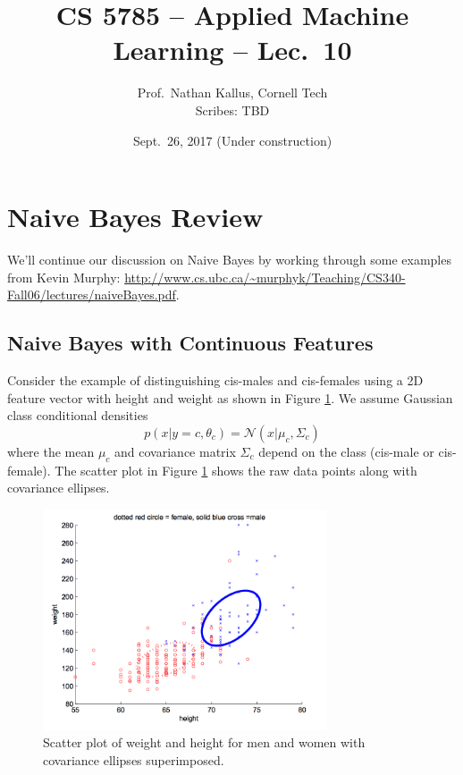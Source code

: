 \documentclass[a4paper]{article}
\title{CS 5785 -- Applied Machine Learning -- Lec.\ 10}
\author{Prof.\ Nathan Kallus, Cornell Tech\\Scribes: TBD}
\date{Sept.\ 26, 2017 (Under construction)}
\begin{document}
\maketitle
 
\section{Naive Bayes Review}

We'll continue our discussion on Naive Bayes by working through some examples from Kevin Murphy: \url{http://www.cs.ubc.ca/~murphyk/Teaching/CS340-Fall06/lectures/naiveBayes.pdf}.  

\subsection{Naive Bayes with Continuous Features}
Consider the example of distinguishing cis-males and cis-females using a 2D feature vector with height and weight as shown in Figure \ref{fig:height_weight}. 
We assume Gaussian class conditional densities
$$
p(x|y=c,\theta_c) = \mathcal{N}(x|\mu_c, \Sigma_c)
$$
where the mean $\mu_c$ and covariance matrix $\Sigma_c$ depend on the class (cis-male or cis-female).
The scatter plot in Figure \ref{fig:height_weight} shows the raw data points along with covariance ellipses.

\begin{figure}
\centering
\includegraphics[width=0.75\textwidth]{fig1_murphy.png}
\caption{\label{fig:height_weight}Scatter plot of weight and height for men and women with covariance ellipses superimposed.}
\end{figure}
\end{document}

